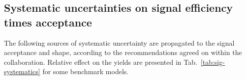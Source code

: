 
%

\subsection{Systematic uncertainties on signal efficiency times acceptance}
\label{sec:sig-syst}
The following sources of systematic uncertainty are propagated to the signal
acceptance and shape, according to the recommendations agreed on within the
collaboration. Relative effect on the yields are presented in
Tab.~\ref{tab:sig-systematics} for some benchmark models.

